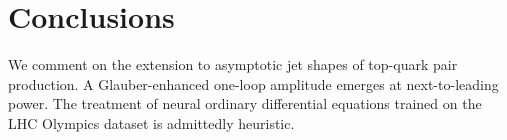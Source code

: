 \section{Conclusions}\label{sec:conclusions}

We comment on the extension to asymptotic jet shapes of top-quark pair
production. A Glauber-enhanced one-loop amplitude emerges at
next-to-leading power. The treatment of neural ordinary differential
equations trained on the LHC Olympics dataset is admittedly heuristic.

